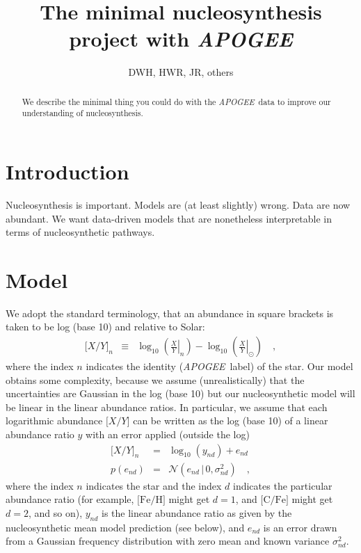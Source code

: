 \documentclass[12pt, preprint]{aastex}
\newcommand{\acronym}[1]{{\small{#1}}}
\newcommand{\project}[1]{\textsl{#1}}
\newcommand{\apogee}{\project{\acronym{APOGEE}}}
\newcommand{\solar}{\odot}
\newcommand{\abundance}[1]{\lbrack{#1}\rbrack}
\newcommand{\element}[1]{\mathrm{#1}}
\newcommand{\given}{\,|\,}
\newcommand{\normal}{\mathcal{N}}
\begin{document}
\title{The minimal nucleosynthesis project with \apogee}
\author{DWH, HWR, JR, others}

\begin{abstract}
We describe the minimal thing you could do with the \apogee\ data to
improve our understanding of nucleosynthesis.
\end{abstract}


\section{Introduction}

Nucleosynthesis is important.  Models are (at least slightly) wrong.
Data are now abundant.  We want data-driven models that are
nonetheless interpretable in terms of nucleosynthetic pathways.

\section{Model}

We adopt the standard terminology, that an abundance in square brackets
is taken to be log (base 10) and relative to Solar:
\begin{eqnarray}
  \abundance{X/Y}_n &\equiv& \log_{10}\left(\left.\frac{X}{Y}\right|_n\right) -
                             \log_{10}\left(\left.\frac{X}{Y}\right|_\solar\right)
\quad ,
\end{eqnarray}
where the index $n$ indicates the identity (\apogee\ label) of the star.
Our model obtains some complexity, because we assume (unrealistically)
that the uncertainties are Gaussian in the log (base 10) but our
nucleosynthetic model will be linear in the linear abundance ratios.
In particular, we assume that each logarithmic abundance $\abundance{X/Y}$
can be written as the log (base 10) of a linear abundance ratio $y$ with
an error applied (outside the log)
\begin{eqnarray}
  \abundance{X/Y}_n &=& \log_{10}(y_{nd}) + e_{nd} \label{eq:model1}
\\
  p(e_{nd}) &=& \normal(e_{nd}\given 0,\sigma^2_{nd}) \label{eq:model2}
\quad ,
\end{eqnarray}
where the index $n$ indicates the star and the index $d$ indicates the
particular abundance ratio (for example, $\abundance{\element{Fe}/\element{H}}$ might get
$d=1$, and $\abundance{\element{C}/\element{Fe}}$ might get $d=2$, and so on), $y_{nd}$ is
the linear abundance ratio as given by the nucleosynthetic mean model
prediction (see below), and $e_{nd}$ is an error drawn from a Gaussian
frequency distribution with zero mean and known variance $\sigma^2_{nd}$.
\end{document}
